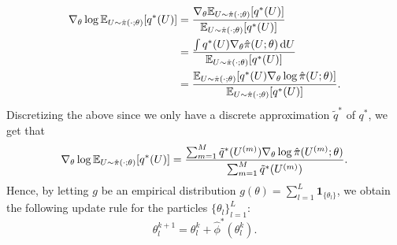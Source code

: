 \documentclass[twoside,11pt]{article}
\begin{document}
\begin{align}
    \nabla_\theta \log \mathbb{E}_{U \sim \hat{\pi}(\cdot; \theta)} [q^*(U)]
    &= \frac{\nabla_\theta \mathbb{E}_{U \sim \hat{\pi}(\cdot; \theta)} [q^*(U)]}{\mathbb{E}_{U \sim \hat{\pi}(\cdot; \theta)} [q^*(U)]} \\
    &= \frac{\int q^*(U) \nabla_\theta \hat{\pi}(U; \theta) \, {\mathrm d} U }{\mathbb{E}_{U \sim \hat{\pi}(\cdot; \theta)} [q^*(U)]} \\
    &= \frac{\mathbb{E}_{U \sim \hat{\pi}(\cdot; \theta)} [q^*(U) \nabla_\theta \log \hat{\pi}(U; \theta)]}{\mathbb{E}_{U \sim \hat{\pi}(\cdot; \theta)} [q^*(U)]} .
\end{align}
Discretizing the above since we only have a discrete approximation $\tilde{q}^*$ of $q^*$, we get that
\begin{equation}
    \nabla_\theta \log \mathbb{E}_{U \sim \hat{\pi}(\cdot; \theta)} [q^*(U)]
    = \frac{\sum_{m=1}^M \tilde{q}^*(U^{(m)}) \nabla_\theta \log \hat{\pi}(U^{(m)}; \theta) }{\sum_{m=1}^M \tilde{q}^*(U^{(m)}) } .
\end{equation}
Hence, by letting $g$ be an empirical distribution $g(\theta) = \sum_{l=1}^L \bm{1}_{\{\theta_l\}}$, we obtain the following update rule for the particles $\{\theta_l\}_{l=1}^L$:
\begin{equation}
    \theta_l^{k+1} = \theta_l^k + \hat{\phi}^*(\theta_l^k) .
\end{equation}

\vskip 0.2in

\end{document}
